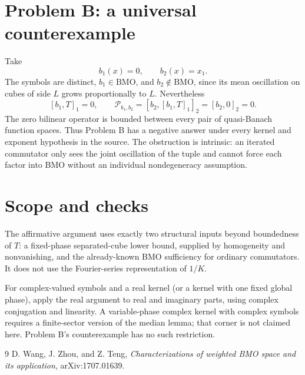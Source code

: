 \documentclass[11pt]{article}
\newcommand{\BMO}{\mathrm{BMO}}
\newcommand{\1}{\mathbf 1}
\begin{document}
\section{Problem B: a universal counterexample}

Take
\[
 b_1(x)=0,\qquad b_2(x)=x_1.
\]
The symbols are distinct, \(b_1\in\BMO\), and \(b_2\notin\BMO\), since its
mean oscillation on cubes of side \(L\) grows proportionally to \(L\).
Nevertheless
\[
 [b_1,T]_1=0,
 \qquad
 \mathcal P_{b_1,b_2}=[b_2,[b_1,T]_1]_2=[b_2,0]_2=0.
\]
The zero bilinear operator is bounded between every pair of quasi-Banach
function spaces.  Thus Problem B has a negative answer under every kernel and
exponent hypothesis in the source.  The obstruction is intrinsic: an
iterated commutator only sees the joint oscillation of the tuple and cannot
force each factor into BMO without an individual nondegeneracy assumption.

\section{Scope and checks}

The affirmative argument uses exactly two structural inputs beyond boundedness
of \(T\): a fixed-phase separated-cube lower bound, supplied by homogeneity and
nonvanishing, and the already-known BMO sufficiency for ordinary commutators.
It does not use the Fourier-series representation of \(1/K\).

For complex-valued symbols and a real kernel (or a kernel with one fixed
global phase), apply the real argument to real and imaginary parts, using
complex conjugation and linearity.  A variable-phase complex kernel with
complex symbols requires a finite-sector version of the median lemma; that
corner is not claimed here.  Problem B's counterexample has no such
restriction.

\begin{thebibliography}{9}
D. Wang, J. Zhou, and Z. Teng,
\emph{Characterizations of weighted BMO space and its application},
arXiv:1707.01639.
\end{thebibliography}
\end{document}
